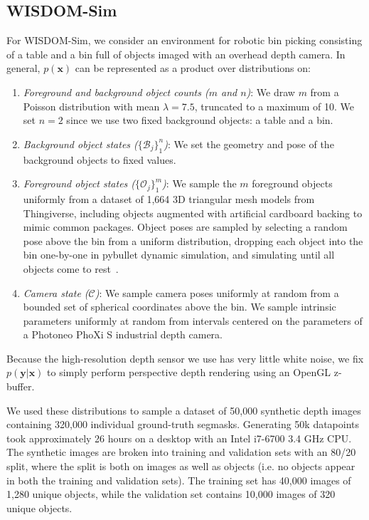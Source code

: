 \documentclass[letterpaper, 10 pt, conference]{ieeeconf}  \pdfoutput=1
\numberwithin{equation}{section}
\newcommand{\bx}{\mathbf{x}}
\newcommand{\by}{\mathbf{y}}
\newcommand{\mO}{\mathcal{O}}
\newcommand{\mB}{\mathcal{B}}
\newcommand{\mC}{\mathcal{C}}
\begin{document}
\subsection{WISDOM-Sim}
For WISDOM-Sim, we consider an environment for robotic bin picking consisting of a table and a bin full of objects imaged with an overhead depth camera.
In general, $p(\bx)$ can be represented as a product over distributions on:
\begin{enumerate}
    \item \textit{Foreground and background object counts ($m$ and $n$)}: We draw $m$ from a Poisson distribution with mean $\lambda=7.5$, truncated to a maximum of 10. We set $n=2$ since we use two fixed background objects: a table and a bin.
    \item \textit{Background object states ($\{\mB_j\}_1^n$)}: We set the geometry and pose of the background objects to fixed values.
    \item \textit{Foreground object states ($\{\mO_j\}_1^m$)}: We sample the $m$ foreground objects uniformly from a dataset of 1,664 3D triangular mesh models from Thingiverse, including objects augmented with artificial cardboard backing to mimic common packages. Object poses are sampled by selecting a random pose above the bin from a uniform distribution, dropping each object into the bin one-by-one in pybullet dynamic simulation, and simulating until all objects come to rest~\cite{mahler2017learning}.
    \item \textit{Camera state ($\mC$)}: We sample camera poses uniformly at random from a bounded set of spherical coordinates above the bin. We sample intrinsic parameters uniformly at random from intervals centered on the parameters of a Photoneo PhoXi S industrial depth camera.
\end{enumerate}
\noindent Because the high-resolution depth sensor we use has very little white noise, we fix $p(\by | \bx)$ to simply perform perspective depth rendering using an OpenGL z-buffer.



We used these distributions to sample a dataset of 50,000 synthetic depth images containing 320,000 individual ground-truth segmasks.
Generating 50k datapoints took approximately 26 hours on a desktop with an Intel i7-6700 3.4 GHz CPU.
The synthetic images are broken into training and validation sets with an 80/20 split, where the split is both on images as well as objects (i.e. no objects appear in both the training and validation sets). The training set has 40,000 images of 1,280 unique objects, while the validation set contains 10,000 images of 320 unique objects.
\end{document}

